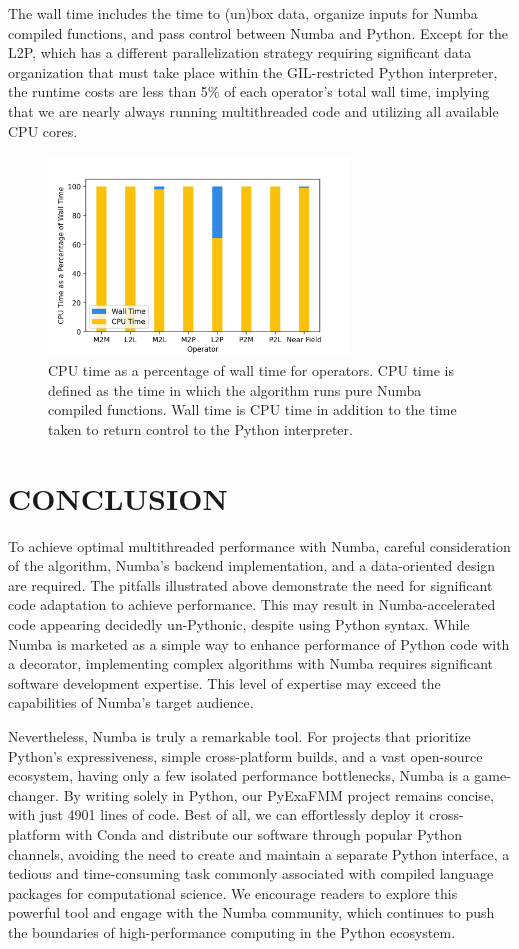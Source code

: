 \documentclass{IEEEcsmag}
\begin{document}
The wall time includes the time to (un)box data, organize inputs for Numba compiled functions, and pass control between Numba and Python. Except for the L2P, which has a different parallelization strategy  requiring significant data organization that must take place within the GIL-restricted Python interpreter, the runtime costs are less than 5\% of each operator's total wall time, implying that we are nearly always running multithreaded code and utilizing all available CPU cores. 

 \begin{figure}
	\centerline{\includegraphics[width=8cm]{figures/cpu_wall.png}}
    \caption{CPU time as a percentage of wall time for operators. CPU time is defined as the time in which the algorithm runs pure Numba compiled functions. Wall time is CPU time in addition to the time taken to return control to the Python interpreter. } 
	\label{fig:cpu_wall}
\end{figure}

\section{CONCLUSION}

To achieve optimal multithreaded performance with Numba, careful consideration of the algorithm, Numba's backend implementation, and a data-oriented design are required. The pitfalls illustrated above demonstrate the need for significant code adaptation to achieve performance. This may result in Numba-accelerated code appearing decidedly un-Pythonic, despite using Python syntax.
While Numba is marketed as a simple way to enhance performance of Python code with a decorator, implementing complex algorithms with Numba requires significant software development expertise. This level of expertise may exceed the capabilities of Numba's target audience.

Nevertheless, Numba is truly a remarkable tool. For projects that prioritize Python's expressiveness, simple cross-platform builds, and a vast open-source ecosystem, having only a few isolated performance bottlenecks, Numba is a game-changer. By writing solely in Python, our PyExaFMM project remains concise, with just 4901 lines of code. Best of all, we can effortlessly deploy it cross-platform with Conda and distribute our software through popular Python channels, avoiding the need to create and maintain a separate Python interface, a tedious and time-consuming task commonly associated with compiled language packages for computational science.
We encourage readers to explore this powerful tool and engage with the Numba community, which continues to push the boundaries of high-performance computing in the Python ecosystem.
\end{document}
